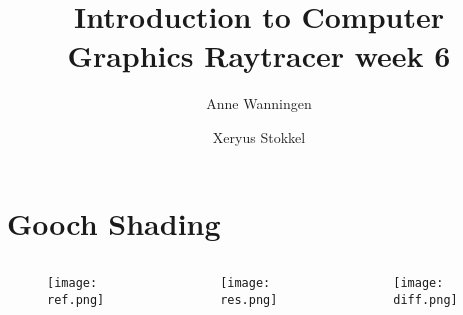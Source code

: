 \documentclass{beamer}
\author{Anne Wanningen \and Xeryus Stokkel}
\title[Week 6]{Introduction to Computer Graphics Raytracer week 6}
\begin{document}
\maketitle

\section{Gooch Shading}

\begin{frame}
	\begin{columns}[T]
		\begin{column}{.3\textwidth}
			\begin{figure}
				\texttt{[image: ref.png]}
			\end{figure}
		\end{column}
		\begin{column}{.3\textwidth}
			\begin{figure}
				\texttt{[image: res.png]}
			\end{figure}
		\end{column}
		\begin{column}{.3\textwidth}
			\begin{figure}
				\texttt{[image: diff.png]}
			\end{figure}
		\end{column}
\end{columns}
\end{frame}
\end{document}

